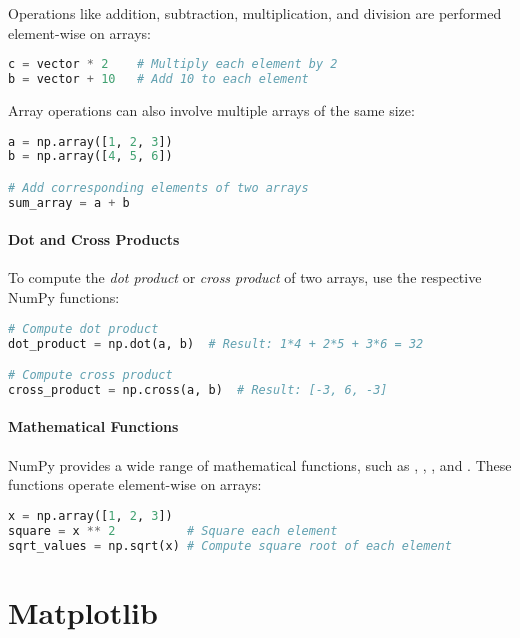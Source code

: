 Operations like addition, subtraction, multiplication, and division are performed element-wise on arrays:

\begin{lstlisting}[language=Python, style=mystyle2]
c = vector * 2    # Multiply each element by 2
b = vector + 10   # Add 10 to each element
\end{lstlisting}

Array operations can also involve multiple arrays of the same size:

\begin{lstlisting}[language=Python, style=mystyle2]
a = np.array([1, 2, 3])
b = np.array([4, 5, 6])

# Add corresponding elements of two arrays
sum_array = a + b
\end{lstlisting}

\paragraph*{Dot and Cross Products}

To compute the \textit{dot product} or \textit{cross product} of two arrays, use the respective NumPy functions:

\begin{lstlisting}[language=Python, style=mystyle2]
# Compute dot product
dot_product = np.dot(a, b)  # Result: 1*4 + 2*5 + 3*6 = 32

# Compute cross product
cross_product = np.cross(a, b)  # Result: [-3, 6, -3]
\end{lstlisting}

\paragraph*{Mathematical Functions}

NumPy provides a wide range of mathematical functions, such as , , , and . These functions operate element-wise on arrays:

\begin{lstlisting}[language=Python, style=mystyle2]
x = np.array([1, 2, 3])
square = x ** 2          # Square each element
sqrt_values = np.sqrt(x) # Compute square root of each element
\end{lstlisting}

\section*{Matplotlib}

